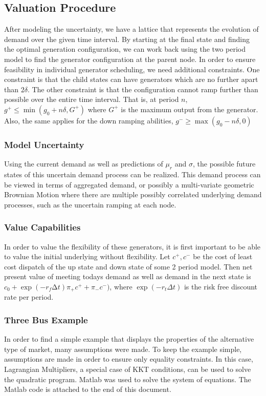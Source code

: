 \subsection{Valuation Procedure}
After modeling the uncertainty, we have a lattice that represents the evolution of demand over the given time interval.  By starting at the final state and finding the optimal generation configuration, we can work back using the two period model to find the generator configuration at the parent node.  In order to ensure feasibility in individual generator scheduling, we need additional constraints.  One constraint is that the child states can have generators which are no further apart than $2\delta$.  The other constraint is that the configuration cannot ramp further than possible over the entire time interval.  That is, at period $n$, $g^+\le \min (g_0 + n \delta, G^+)⁡ $ where $G^+$ is the maximum output from the generator.  Also, the same applies for the down ramping abilities, $g^- \ge \max (g_0 - n \delta,0) $

\subsubsection{Model Uncertainty}
	Using the current demand as well as predictions of $\mu_r$ and $\sigma$, the possible future states of this uncertain demand process can be realized.  This demand process can be viewed in terms of aggregated demand, or possibly a multi-variate geometric Brownian Motion where there are multiple possibly correlated underlying demand processes, such as the uncertain ramping at each node.  

\subsubsection{Value Capabilities}
	In order to value the flexibility of these generators, it is first important to be able to value the initial underlying without flexibility.  Let $c^+,c^-$ be the cost of least cost dispatch of the up state and down state of some 2 period model.  Then net present value of meeting todays demand as well as demand in the next state is $c_0+ \exp⁡ (-r_f ∆t) \pi_+ c^+ + \pi_- c^-)$, where $\exp⁡ (-r_t \Delta t)$ is the risk free discount rate per period.

\subsubsection{Three Bus Example}
In order to find a simple example that displays the properties of the alternative type of market, many assumptions were made.  To keep the example simple, assumptions are made in order to ensure only equality constraints.  In this case, Lagrangian Multipliers, a special case of KKT conditions, can be used to solve the quadratic program.  Matlab was used to solve the system of equations.  The Matlab code is attached to the end of this document.

